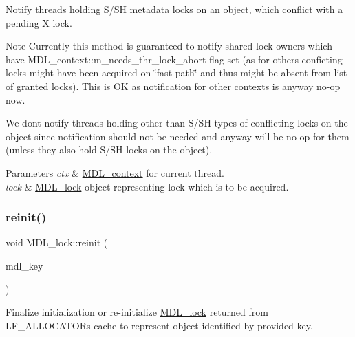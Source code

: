Notify threads holding S/\+SH metadata locks on an object, which conflict with a pending X lock.

\begin{DoxyNote}{Note}
Currently this method is guaranteed to notify shared lock owners which have M\+D\+L\+\_\+context\+::m\+\_\+needs\+\_\+thr\+\_\+lock\+\_\+abort flag set (as for others conficting locks might have been acquired on \char`\"{}fast path\char`\"{} and thus might be absent from list of granted locks). This is OK as notification for other contexts is anyway no-\/op now.

We don\textquotesingle{}t notify threads holding other than S/\+SH types of conflicting locks on the object since notification should not be needed and anyway will be no-\/op for them (unless they also hold S/\+SH locks on the object).
\end{DoxyNote}

\begin{DoxyParams}{Parameters}
{\em ctx} & \mbox{\hyperlink{classMDL__context}{M\+D\+L\+\_\+context}} for current thread. \\
\hline
{\em lock} & \mbox{\hyperlink{classMDL__lock}{M\+D\+L\+\_\+lock}} object representing lock which is to be acquired. \\
\hline
\end{DoxyParams}
\mbox{\label{classMDL__lock_aaa2f6326006b7c7ba179075c82707d59}} 
\subsubsection{\texorpdfstring{reinit()}{reinit()}}
{\footnotesize\ttfamily void M\+D\+L\+\_\+lock\+::reinit (\begin{DoxyParamCaption}\item[{const \mbox{\hyperlink{structMDL__key}{M\+D\+L\+\_\+key}} $\ast$}]{mdl\+\_\+key }\end{DoxyParamCaption})\hspace{0.3cm}{\ttfamily [inline]}}

Finalize initialization or re-\/initialize \mbox{\hyperlink{classMDL__lock}{M\+D\+L\+\_\+lock}} returned from L\+F\+\_\+\+A\+L\+L\+O\+C\+A\+T\+OR\textquotesingle{}s cache to represent object identified by provided key.

